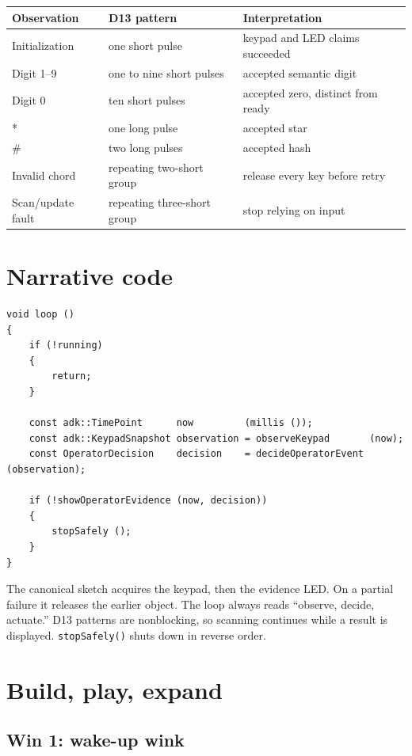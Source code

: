 \documentclass[11pt]{article}
\begin{document}
\begin{tabularx}{\linewidth}{@{}l l X@{}}
\toprule
Observation & D13 pattern & Interpretation\\
\midrule
Initialization & one short pulse & keypad and LED claims succeeded\\
Digit 1--9 & one to nine short pulses & accepted semantic digit\\
Digit 0 & ten short pulses & accepted zero, distinct from ready\\
* & one long pulse & accepted star\\
\# & two long pulses & accepted hash\\
Invalid chord & repeating two-short group & release every key before retry\\
Scan/update fault & repeating three-short group & stop relying on input\\
\bottomrule
\end{tabularx}

\section{Narrative code}

\begin{lstlisting}[style=adkcpp]
void loop ()
{
    if (!running)
    {
        return;
    }

    const adk::TimePoint      now         (millis ());
    const adk::KeypadSnapshot observation = observeKeypad       (now);
    const OperatorDecision    decision    = decideOperatorEvent (observation);

    if (!showOperatorEvidence (now, decision))
    {
        stopSafely ();
    }
}
\end{lstlisting}

The canonical sketch acquires the keypad, then the evidence LED. On a partial
failure it releases the earlier object. The loop always reads
``observe, decide, actuate.'' D13 patterns are nonblocking, so scanning
continues while a result is displayed. \texttt{stopSafely()} shuts down in
reverse order.

\section{Build, play, expand}

\subsection{Win 1: wake-up wink}
\end{document}
